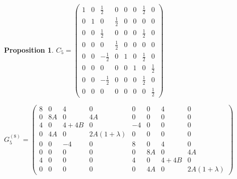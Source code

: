 \documentclass{amsart}
\theoremstyle{plain}
\newtheorem{proposition}[theorem]{Proposition}
\theoremstyle{definition}
\theoremstyle{remark}
\numberwithin{equation}{section}
\begin{document}
\begin{proposition}
\vspace{0.5cm}
\begin{minipage}[t]{0.38\textwidth}
    \vspace{5pt}
    { %
    $C_5 = 
    \begin{pmatrix}
    1 & 0 & \frac{1}{2} & 0 & 0 & 0 & \frac{1}{2} & 0 \\
    0 & 1 & 0 & \frac{1}{2} & 0 & 0 & 0 & 0 \\
    0 & 0 & \frac{1}{2} & 0 & 0 & 0 & \frac{1}{2} & 0 \\
    0 & 0 & 0 & \frac{1}{2} & 0 & 0 & 0 & 0 \\
    0 & 0 & -\frac{1}{2} & 0 & 1 & 0 & \frac{1}{2} & 0 \\
    0 & 0 & 0 & 0 & 0 & 1 & 0 & \frac{1}{2} \\
    0 & 0 & -\frac{1}{2} & 0 & 0 & 0 & \frac{1}{2} & 0 \\
    0 & 0 & 0 & 0 & 0 & 0 & 0 & \frac{1}{2} 
    \end{pmatrix}
    $
    }
\end{minipage}
\hfill
\begin{minipage}[t]{0.62\textwidth}
    \vspace{5pt}
    { %
    $G_{5}^{(8)} = 
    \begin{pmatrix}
    8 & 0 & 4 & 0 & 0 & 0 & 4 & 0 \\
    0 & 8A & 0 & 4A & 0 & 0 & 0 & 0 \\
    4 & 0 & 4+4B & 0 & -4 & 0 & 0 & 0 \\
    0 & 4A & 0 & 2A(1+\lambda) & 0 & 0 & 0 & 0 \\
    0 & 0 & -4 & 0 & 8 & 0 & 4 & 0 \\
    0 & 0 & 0 & 0 & 0 & 8A & 0 & 4A \\
    4 & 0 & 0 & 0 & 4 & 0 & 4+4B & 0 \\
    0 & 0 & 0 & 0 & 0 & 4A & 0 & 2A(1+\lambda)
    \end{pmatrix}
    $
    }
\end{minipage}
\vspace{0.5cm}
\begin{minipage}[t]{0.38\textwidth}
    \vspace{5pt}
    { %
}
\end{minipage}
\end{proposition}
\end{document}

